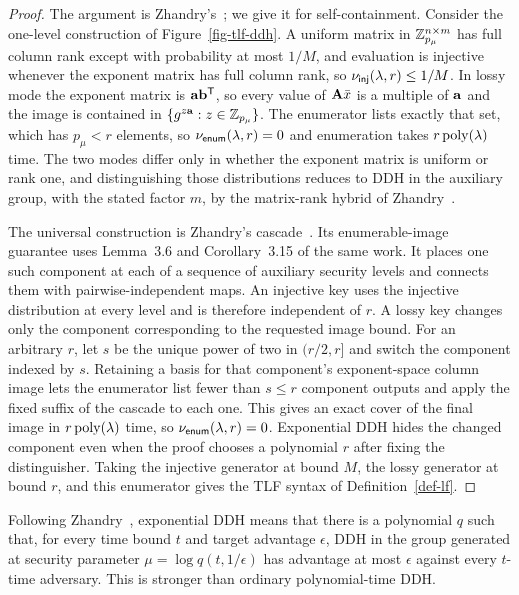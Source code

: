 \begin{proof}
The argument is Zhandry's~\cite{EPRINT:Zhandry16}; we give it for
self-containment. Consider the one-level construction of
Figure~\ref{fig-tlf-ddh}. A uniform
matrix in $\mathbb Z_{p_\mu}^{n\times m}$ has full column rank except with probability
at most $1/M$, and evaluation is injective whenever the exponent matrix has full
column rank, so $\nu_{\mathsf{inj}}(\lambda,r)\le1/M$. In lossy mode the exponent
matrix is $\mathbf{a}\mathbf{b}^{\mathsf T}$, so every value of $\mathbf{A}\bar x$ is a
multiple of $\mathbf{a}$ and the image is contained in
$\{g^{z\mathbf{a}}:z\in\mathbb Z_{p_\mu}\}$. The enumerator lists exactly that set, which
has $p_\mu<r$ elements, so $\nu_{\mathsf{enum}}(\lambda,r)=0$ and enumeration takes
$r\mathop{\rm poly}\nolimits(\lambda)$ time. The two modes differ only in whether the exponent matrix is
uniform or rank one, and distinguishing those distributions reduces to DDH in the
auxiliary group, with the stated factor $m$, by the matrix-rank hybrid of
Zhandry~\cite[Theorem~3.14]{EPRINT:Zhandry16}.

The universal construction is Zhandry's
cascade~\cite[Theorem~3.9]{EPRINT:Zhandry16}. Its enumerable-image guarantee
uses Lemma~3.6 and Corollary~3.15 of the same work.
It places one such component at each of a sequence of auxiliary security
levels and connects them with pairwise-independent maps. An injective key
uses the injective distribution at every level and is therefore independent
of $r$. A lossy key changes only the component corresponding to the requested
image bound. For an arbitrary $r$, let $s$ be the unique power of two in
$(r/2,r]$ and switch the component indexed by $s$. Retaining a basis for that
component's exponent-space column image lets the enumerator list fewer than
$s\le r$ component outputs and apply the fixed suffix of the cascade to each
one. This gives an exact cover of the final image in $r\mathop{\rm poly}\nolimits(\lambda)$ time, so
$\nu_{\mathsf{enum}}(\lambda,r)=0$. Exponential DDH hides the changed component
even when the proof chooses a polynomial $r$ after fixing the distinguisher.
Taking the injective generator at bound $M$, the lossy generator at bound $r$,
and this enumerator gives the TLF syntax of Definition~\ref{def-lf}.
\end{proof}

Following Zhandry~\cite[Definition~3.11]{EPRINT:Zhandry16}, exponential DDH
means that there is a polynomial $q$ such that, for every time bound $t$ and
target advantage $\epsilon$, DDH in the group generated at security parameter
$\mu=\log q(t,1/\epsilon)$ has advantage at most $\epsilon$ against every
$t$-time adversary. This is stronger than ordinary polynomial-time DDH.

